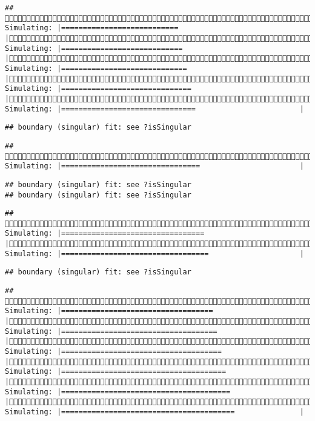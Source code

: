 \documentclass[]{article}
\begin{document}
\begin{verbatim}
## (1/4) Simulating: |===========================                            |(1/4) Simulating: |============================                           |(1/4) Simulating: |=============================                          |(1/4) Simulating: |==============================                         |(1/4) Simulating: |===============================                        |
\end{verbatim}

\begin{verbatim}
## boundary (singular) fit: see ?isSingular
\end{verbatim}

\begin{verbatim}
## (1/4) Simulating: |================================                       |
\end{verbatim}

\begin{verbatim}
## boundary (singular) fit: see ?isSingular
## boundary (singular) fit: see ?isSingular
\end{verbatim}

\begin{verbatim}
## (1/4) Simulating: |=================================                      |(1/4) Simulating: |==================================                     |
\end{verbatim}

\begin{verbatim}
## boundary (singular) fit: see ?isSingular
\end{verbatim}

\begin{verbatim}
## (1/4) Simulating: |===================================                    |(1/4) Simulating: |====================================                   |(1/4) Simulating: |=====================================                  |(1/4) Simulating: |======================================                 |(1/4) Simulating: |=======================================                |(1/4) Simulating: |========================================               |
\end{verbatim}
\end{document}
